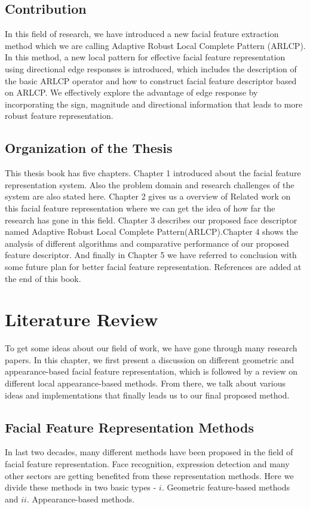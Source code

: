 \documentclass[12pt]{article}
\begin{document}
\subsection{Contribution}
\noindent In this field of research, we have introduced a new facial feature extraction method which we are calling Adaptive Robust Local Complete Pattern
(ARLCP). In this method,  a new local pattern for effective facial feature representation using directional edge responses\cite{facialExpressions1} is introduced, which includes the description of the basic ARLCP operator and how to construct facial feature descriptor based on ARLCP. We effectively explore the advantage of edge response by incorporating the sign, magnitude and directional information that leads to more robust feature representation.\\

\subsection{Organization of the Thesis}
This thesis book has five chapters. Chapter 1 introduced about the facial feature representation system. Also the problem domain and research challenges of the system are also stated here. Chapter 2 gives us a overview of Related work on this
facial feature representation where we can get the idea of how far the research has
gone in this field. Chapter 3 describes our proposed face descriptor named Adaptive Robust Local Complete Pattern(ARLCP).Chapter 4 shows the analysis of different algorithms and comparative performance of our proposed feature descriptor. And finally in Chapter 5 we have referred to conclusion with some future plan for better facial feature representation. References are added at the end of this book.\\

\newpage
\section{Literature Review}
\label{chap:ch2}

To get some ideas about our field of work, we have gone through many research papers. In this chapter, we first present a discussion on different geometric and
appearance-based facial feature representation, which is followed by a review on
different local appearance-based methods. From there, we talk about various ideas and implementations that finally leads us to our final proposed method.\\
\subsection{Facial Feature Representation Methods}
\noindent In last two decades, many different methods have been proposed in the field of facial feature representation. Face recognition, expression detection and many other sectors are getting benefited from these representation methods. Here we divide these methods in two basic types - $i.$ Geometric feature-based methods  and $ii.$ Appearance-based methods.\\
\end{document}
